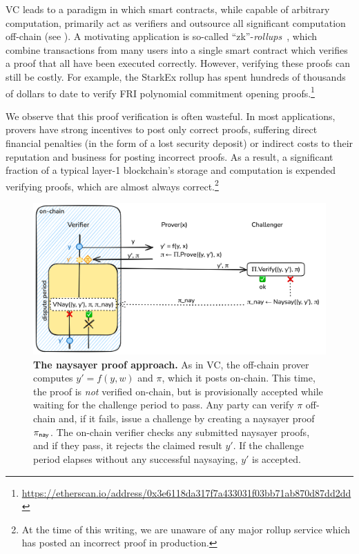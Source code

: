 VC leads to a paradigm in which smart contracts, while capable of arbitrary computation, primarily act as verifiers and outsource all significant computation off-chain (see ). A motivating application is so-called ``zk''-\emph{rollups}~\cite{starknet,zksync,aztec,dydx,scroll}, which combine transactions from many users into a single smart contract which verifies a proof that all have been executed correctly. However, verifying these proofs can still be costly. For example, the StarkEx rollup 
has spent hundreds of thousands of dollars to date to verify FRI polynomial commitment opening proofs.\footnote{\url{https://etherscan.io/address/0x3e6118da317f7a433031f03bb71ab870d87dd2dd}}

We observe that this proof verification is often wasteful. In most applications, provers have strong incentives to post only correct proofs, suffering direct financial penalties (in the form of a lost security deposit) or indirect costs to their reputation and business for posting incorrect proofs. As a result, a significant fraction of a typical layer-1 blockchain's storage and computation is expended verifying proofs, which are almost always correct.\footnote{At the time of this writing, we are unaware of any major rollup service which has posted an incorrect proof in production.}

 \begin{figure}[tbh]
    \includegraphics[width=\textwidth]{naysayer/figs/naysayer.png}
    \caption{\textbf{The naysayer proof approach.} As in VC, the off-chain prover computes $y' = f(y, w)$ and $\pi$, which it posts on-chain. This time, the proof is \emph{not} verified on-chain, but is provisionally accepted while waiting for the challenge period to pass. Any party can verify $\pi$ off-chain and, if it fails, issue a challenge by creating a naysayer proof $\pi_{\mathsf{nay}}$. The on-chain verifier checks any submitted naysayer proofs, and if they pass, it rejects the claimed result $y'$. If the challenge period elapses without any successful naysaying, $y'$ is accepted.}
    \label{fig:naysayer}
 \end{figure}

